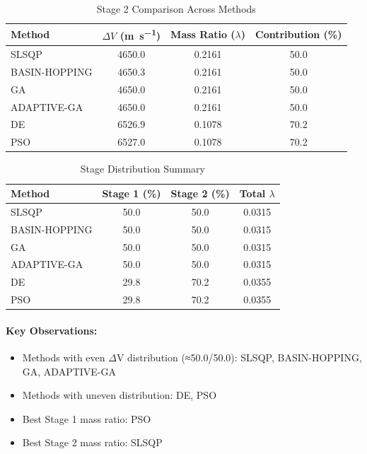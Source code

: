 \documentclass{article}
\begin{document}
\begin{table}[H]
\centering
\caption{Stage 2 Comparison Across Methods}
\begin{tabular}{lS[table-format=4.1]S[table-format=1.4]S[table-format=3.1]}
\toprule
Method & {$\Delta V$ (\si{\meter\per\second})} & {Mass Ratio ($\lambda$)} & {Contribution (\%)} \\
\midrule
SLSQP        & 4650.0 & 0.2161 & 50.0 \\
BASIN-HOPPING & 4650.3 & 0.2161 & 50.0 \\
GA           & 4650.0 & 0.2161 & 50.0 \\
ADAPTIVE-GA  & 4650.0 & 0.2161 & 50.0 \\
DE           & 6526.9 & 0.1078 & 70.2 \\
PSO          & 6527.0 & 0.1078 & 70.2 \\
\bottomrule
\end{tabular}
\end{table}

\begin{table}[H]
\centering
\caption{Stage Distribution Summary}
\begin{tabular}{lS[table-format=4.1]S[table-format=4.1]S[table-format=1.4]}
\toprule
Method & {Stage 1 (\%)} & {Stage 2 (\%)} & {Total $\lambda$} \\
\midrule
SLSQP        & 50.0 & 50.0 & 0.0315 \\
BASIN-HOPPING & 50.0 & 50.0 & 0.0315 \\
GA           & 50.0 & 50.0 & 0.0315 \\
ADAPTIVE-GA  & 50.0 & 50.0 & 0.0315 \\
DE           & 29.8 & 70.2 & 0.0355 \\
PSO          & 29.8 & 70.2 & 0.0355 \\
\bottomrule
\end{tabular}
\end{table}

\paragraph{Key Observations:}
\begin{itemize}
\item Methods with even $\Delta$V distribution (≈50.0/50.0): SLSQP, BASIN-HOPPING, GA, ADAPTIVE-GA
\item Methods with uneven distribution: DE, PSO
\item Best Stage 1 mass ratio: PSO
\item Best Stage 2 mass ratio: SLSQP
\end{itemize}
\end{document}
